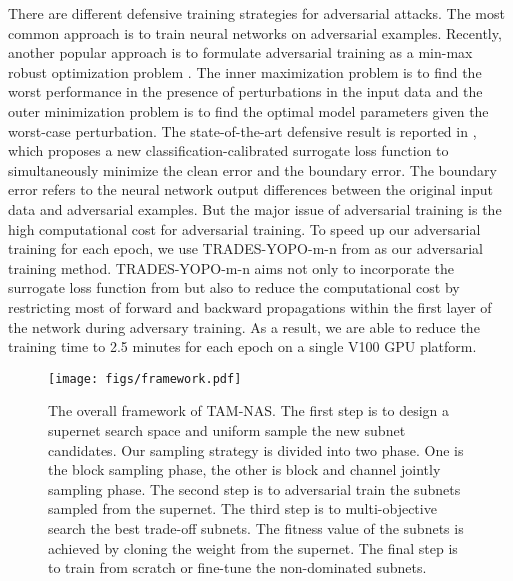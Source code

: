 \documentclass[journal]{IEEEtran}
\begin{document}
There are different defensive training strategies for adversarial attacks. The most common approach \cite{goodfellow:goodfellow2014explaining} is to train neural networks on adversarial examples. Recently, another popular approach is to formulate adversarial training as a min-max robust optimization problem \cite{madry:madry2017towards, wong:wong2018scaling}. The inner maximization problem is to find the worst performance in the presence of perturbations in the input data and the outer minimization problem is to find the optimal model parameters given the worst-case perturbation. The state-of-the-art defensive result is reported in \cite{zhang:zhang2019theoretically}, which proposes a new classification-calibrated surrogate loss function to simultaneously minimize the clean error and the boundary error. The boundary error refers to the neural network output differences between the original input data and adversarial examples. But the major issue of adversarial training is the high computational cost for adversarial training. To speed up our adversarial training for each epoch, we use TRADES-YOPO-m-n from \cite{zhang:zhang2019you} as our adversarial training method. TRADES-YOPO-m-n aims not only to incorporate the surrogate loss function from \cite{zhang:zhang2019theoretically} but also to reduce the computational cost by restricting most of forward and backward propagations within the first layer of the network during adversary training. As a result, we are able to reduce the training time to 2.5 minutes for each epoch on a single V100 GPU platform.   

\begin{figure*}[htb]
    \centering
    \texttt{[image: figs/framework.pdf]}
    \caption{The overall framework of TAM-NAS. The first step is to design a supernet search space and uniform sample the new subnet candidates. Our sampling strategy is divided into two phase. One is the block sampling phase, the other is block and channel jointly sampling phase. The second step is to adversarial train the subnets sampled from the supernet. The third step is to multi-objective search the best trade-off subnets. The fitness value of the subnets is achieved by cloning the weight from the supernet. The final step is to train from scratch or fine-tune the non-dominated subnets. }
    \label{fig:framework}
\end{figure*}
\end{document}
